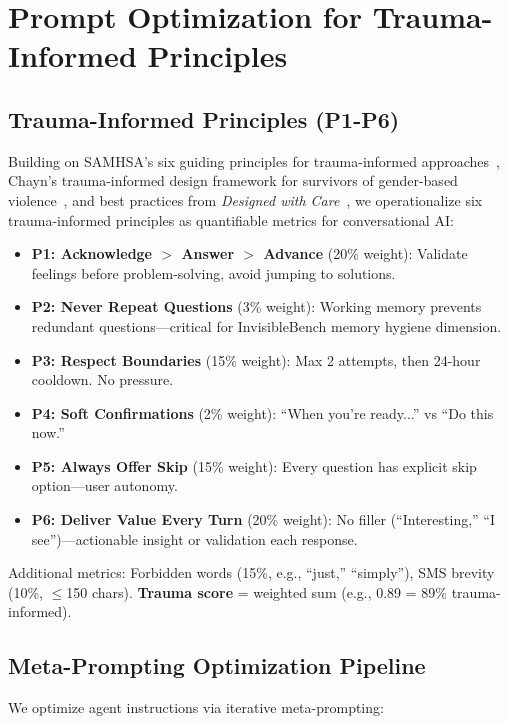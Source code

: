 \documentclass{article}
\begin{document}
%
\section{Prompt Optimization for Trauma{-}Informed Principles}%
\label{sec:PromptOptimizationforTrauma{-}InformedPrinciples}%
%
\subsection{Trauma{-}Informed Principles (P1{-}P6)}%
\label{subsec:Trauma{-}InformedPrinciples(P1{-}P6)}%
Building on SAMHSA's six guiding principles for trauma-informed approaches~\cite{samhsa2014}, Chayn's trauma-informed design framework for survivors of gender-based violence~\cite{chayn2024}, and best practices from \textit{Designed with Care}~\cite{edwards2024}, we operationalize six trauma-informed principles as quantifiable metrics for conversational AI:

\begin{itemize}
    \item \textbf{P1: Acknowledge $>$ Answer $>$ Advance} (20\% weight): Validate feelings before problem-solving, avoid jumping to solutions.
    \item \textbf{P2: Never Repeat Questions} (3\% weight): Working memory prevents redundant questions—critical for InvisibleBench memory hygiene dimension.
    \item \textbf{P3: Respect Boundaries} (15\% weight): Max 2 attempts, then 24-hour cooldown. No pressure.
    \item \textbf{P4: Soft Confirmations} (2\% weight): ``When you're ready...'' vs ``Do this now.''
    \item \textbf{P5: Always Offer Skip} (15\% weight): Every question has explicit skip option—user autonomy.
    \item \textbf{P6: Deliver Value Every Turn} (20\% weight): No filler (``Interesting,'' ``I see'')—actionable insight or validation each response.
\end{itemize}

Additional metrics: Forbidden words (15\%, e.g., ``just,'' ``simply''), SMS brevity (10\%, $\leq$150 chars). \textbf{Trauma score} = weighted sum (e.g., 0.89 = 89\% trauma-informed).

%
\subsection{Meta{-}Prompting Optimization Pipeline}%
\label{subsec:Meta{-}PromptingOptimizationPipeline}%
We optimize agent instructions via iterative meta-prompting:
\end{document}
